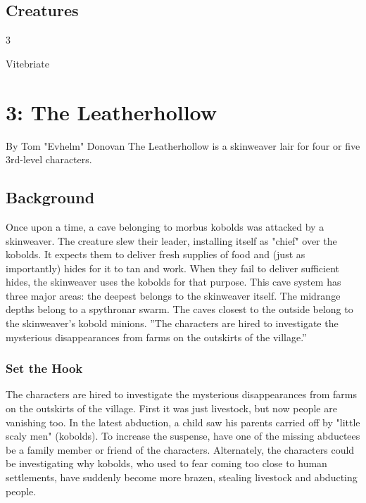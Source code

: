 \documentclass[10pt,a4paper,twoside,twocolumn,openany,bg=print,nodeprecatedcode]{dndbook}
\begin{document}
\section{Creatures}

\begin{itemize}
\begin{multicols}{3}
\item Vitebriate
\end{multicols}

\end{itemize}

\chapter{3: The Leatherhollow}
By Tom "Evhelm" Donovan
The Leatherhollow is a skinweaver lair for four or five 3rd-level characters.
\section{Background}
Once upon a time, a cave belonging to morbus kobolds was attacked by a skinweaver. The creature slew their leader, installing itself as "chief" over the kobolds. It expects them to deliver fresh supplies of food and (just as importantly) hides for it to tan and work. When they fail to deliver sufficient hides, the skinweaver uses the kobolds for that purpose.
This cave system has three major areas: the deepest belongs to the skinweaver itself. The midrange depths belong to a spythronar swarm. The caves closest to the outside belong to the skinweaver's kobold minions.
\DndQuote%
{}
{''The characters are hired to investigate the mysterious disappearances from farms on the outskirts of the village.''}
{}
\subsection{Set the Hook}
The characters are hired to investigate the mysterious disappearances from farms on the outskirts of the village. First it was just livestock, but now people are vanishing too. In the latest abduction, a child saw his parents carried off by "little scaly men" (kobolds). To increase the suspense, have one of the missing abductees be a family member or friend of the characters.
Alternately, the characters could be investigating why kobolds, who used to fear coming too close to human settlements, have suddenly become more brazen, stealing livestock and abducting people.
\end{document}
